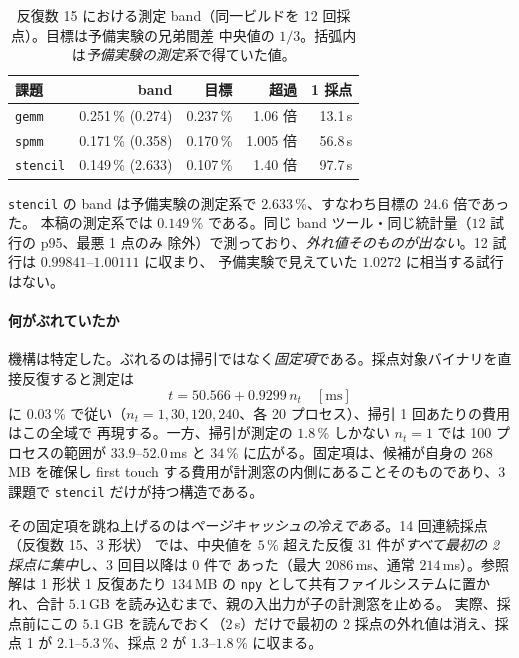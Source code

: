 \documentclass[conference,letterpaper]{IEEEtran}
\begin{document}
\begin{table}[t]\centering\footnotesize
\caption{反復数 15 における測定 band（同一ビルドを 12 回採点）。目標は予備実験の兄弟間差
中央値の $1/3$。括弧内は\emph{予備実験の測定系}で得ていた値。}
\label{tab:band}
\begin{tabular}{lrrrr}
\toprule
課題 & band & 目標 & 超過 & 1 採点 \\
\midrule
\texttt{gemm}    & 0.251\,\% (0.274) & 0.237\,\% & 1.06 倍 & 13.1\,s \\
\texttt{spmm}    & 0.171\,\% (0.358) & 0.170\,\% & 1.005 倍 & 56.8\,s \\
\texttt{stencil} & 0.149\,\% (2.633) & 0.107\,\% & 1.40 倍 & 97.7\,s \\
\bottomrule
\end{tabular}
\end{table}

\texttt{stencil} の band は予備実験の測定系で $2.633$\,\%、すなわち目標の $24.6$ 倍であった。
本稿の測定系では $0.149$\,\% である。同じ band ツール・同じ統計量（$12$ 試行の p95、最悪 1 点のみ
除外）で測っており、\emph{外れ値そのものが出ない}。12 試行は $0.99841$--$1.00111$ に収まり、
予備実験で見えていた $1.0272$ に相当する試行はない。

\paragraph*{何がぶれていたか}
機構は特定した。ぶれるのは掃引ではなく\emph{固定項}である。採点対象バイナリを直接反復すると測定は
\begin{equation}
t = 50.566 + 0.9299\,n_t \quad [\mathrm{ms}]
\label{eq:stencil_fit}
\end{equation}
に $0.03$\,\% で従い（$n_t=1,30,120,240$、各 20 プロセス）、掃引 1 回あたりの費用はこの全域で
再現する。一方、掃引が測定の $1.8$\,\% しかない $n_t=1$ では 100 プロセスの範囲が
$33.9$--$52.0$\,ms と $34$\,\% に広がる。固定項は、候補が自身の $268$\,MB を確保し first touch
する費用が計測窓の内側にあることそのものであり、3 課題で \texttt{stencil} だけが持つ構造である。

その固定項を跳ね上げるのは\emph{ページキャッシュの冷えである}。14 回連続採点（反復数 15、3 形状）
では、中央値を $5$\,\% 超えた反復 31 件が\emph{すべて最初の 2 採点に集中}し、3 回目以降は 0 件で
あった（最大 $2086$\,ms、通常 $214$\,ms）。参照解は 1 形状 1 反復あたり $134$\,MB の \texttt{npy}
として共有ファイルシステムに置かれ、合計 $5.1$\,GB を読み込むまで、親の入出力が子の計測窓を止める。
実際、採点前にこの $5.1$\,GB を読んでおく（$2$\,s）だけで最初の 2 採点の外れ値は消え、採点 1 が
$2.1$--$5.3$\,\%、採点 2 が $1.3$--$1.8$\,\% に収まる。
\end{document}
